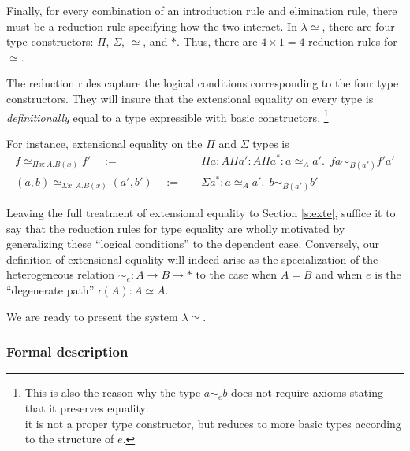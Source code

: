 \documentclass[10pt]{article}
\newcommand{\leeq}{\lambda {\eeq}}
\newcommand{\sta}{*}
\newcommand{\ee}[1]{\simeq_{#1}}
\newcommand{\refl}[1]{{\mathsf{r}({#1})}}
\newcommand{\eeq}{\simeq}
\renewcommand{\refl}[1]{\mathsf{r}({#1})}
\newcommand{\df}{\quad:=\quad}
\begin{document}
Finally, for every combination of an introduction rule and elimination
rule, there must be a reduction rule specifying how the two
interact.  In $\leeq$, there are four type constructors: $\Pi$,
$\Sigma$, $\eeq$, and $\sta$.  Thus, there are $4 \times 1 = 4$
reduction rules for $\eeq$.

The reduction rules capture the logical conditions corresponding
to the four
type constructors.  They will insure that the extensional equality on
every type is \emph{definitionally} equal to a type expressible with
basic constructors.
\footnote{
This is also the reason why the type $a \sim_e b$ does not require axioms stating that
it preserves equality:\\ it is not a proper type constructor, but 
reduces to more basic types according to the structure of $e$.}

For instance, extensional equality on the $\Pi$ and $\Sigma$ types
is
\begin{align*}
  f \ee {\Pi x{:}A.B(x)} f' \df &\Pi a{:}A\Pi a'{:}A\Pi a^* : a \ee A
  a'.\ \ f a \sim_{B(a^*)} f' a' \\
  (a,b) \ee {\Sigma x{:}A. B(x)} (a',b')
  \df &\Sigma a^* : a \ee {A} a'. \ \ b \sim_{B(a^*)} b'
\end{align*}

Leaving the full treatment of extensional equality to Section \ref{s:exte},
suffice it to say that the reduction rules for type equality are wholly
motivated by generalizing these ``logical conditions'' to the dependent
case.
Conversely, our definition of extensional equality will indeed
arise as the specialization of the heterogeneous
relation $\sim_e : A \to B \to \sta$ to the case when $A = B$
and when $e$ is the ``degenerate path'' $\refl{A} : A \eeq A$.

We are ready to present the system $\leeq$.

\subsubsection*{Formal description}
\end{document}
